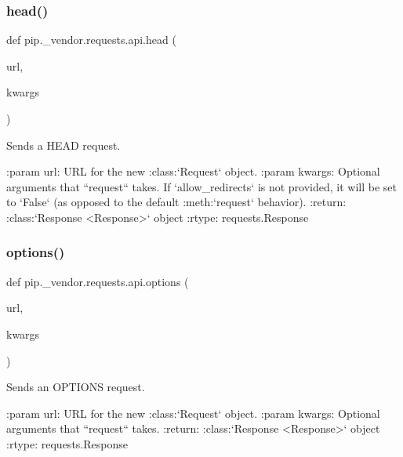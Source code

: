 \subsubsection{\texorpdfstring{head()}{head()}}
{\footnotesize\ttfamily def pip.\+\_\+vendor.\+requests.\+api.\+head (\begin{DoxyParamCaption}\item[{}]{url,  }\item[{}]{kwargs }\end{DoxyParamCaption})}

\begin{DoxyVerb}Sends a HEAD request.

:param url: URL for the new :class:`Request` object.
:param \*\*kwargs: Optional arguments that ``request`` takes. If
    `allow_redirects` is not provided, it will be set to `False` (as
    opposed to the default :meth:`request` behavior).
:return: :class:`Response <Response>` object
:rtype: requests.Response
\end{DoxyVerb}
 \mbox{\label{namespacepip_1_1__vendor_1_1requests_1_1api_a3e92ef5a4bb0ded15ebae698682cd298}} 
\subsubsection{\texorpdfstring{options()}{options()}}
{\footnotesize\ttfamily def pip.\+\_\+vendor.\+requests.\+api.\+options (\begin{DoxyParamCaption}\item[{}]{url,  }\item[{}]{kwargs }\end{DoxyParamCaption})}

\begin{DoxyVerb}Sends an OPTIONS request.

:param url: URL for the new :class:`Request` object.
:param \*\*kwargs: Optional arguments that ``request`` takes.
:return: :class:`Response <Response>` object
:rtype: requests.Response
\end{DoxyVerb}
 \mbox{\label{namespacepip_1_1__vendor_1_1requests_1_1api_ad06473c4ed3671afd03c5726cfad05fa}} 
